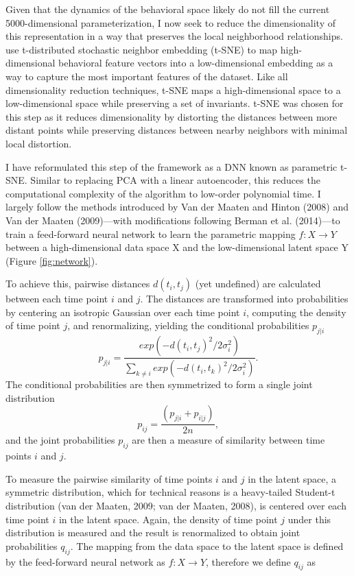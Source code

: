 \documentclass[11pt,a4paper,oneside]{article}
\begin{document}
\begin{appendices}
Given that the dynamics of the behavioral space likely do not fill the current 5000-dimensional parameterization, I now seek to reduce the dimensionality of this representation in a way that preserves the local neighborhood relationships. \citet{berman2014mapping,berman2014drosopholid} use t-distributed stochastic neighbor embedding (t-SNE) to map high-dimensional behavioral feature vectors into a low-dimensional embedding as a way to capture the most important features of the dataset. Like all dimensionality reduction techniques, t-SNE maps a high-dimensional space to a low-dimensional space while preserving a set of invariants. t-SNE was chosen for this step as it reduces dimensionality by distorting the distances between more distant points while preserving distances between nearby neighbors with minimal local distortion.
\par
I have reformulated this step of the framework as a DNN known as parametric t-SNE. Similar to replacing PCA with a linear autoencoder, this reduces the computational complexity of the algorithm to low-order polynomial time. I largely follow the methods introduced by Van der Maaten and Hinton (2008) and Van der Maaten (2009)---with modifications following Berman et al. (2014)---to train a feed-forward neural network to learn the parametric mapping $f: X \to Y$ between a high-dimensional data space X and the low-dimensional latent space Y (Figure \ref{fig:network}). 
\par
To achieve this, pairwise distances $d(t_i,t_j)$ (yet undefined) are calculated between each time point $i$ and $j$. The distances are transformed into probabilities by centering an isotropic Gaussian over each time point $i$, computing the density of time point $j$, and renormalizing, yielding the conditional probabilities $p_{j|i}$
\begin{equation}
p_{j|i}= \frac{exp(-d(t_i,t_j)^2/2\sigma^2_i)}
{\sum_{k\neq i} exp(-d(t_i,t_k)^2/2\sigma^2_i)}.
\end{equation}
The conditional probabilities are then symmetrized to form a single joint distribution
\begin{equation}
p_{ij} = \frac{(p_{j|i} + p_{i|j})}{2n},
\end{equation}
and the joint probabilities $p_{ij}$ are then a measure of similarity between time points $i$ and $j$.
\par
To measure the pairwise similarity of time points $i$ and $j$ in the latent space, a symmetric distribution, which for technical reasons is a heavy-tailed Student-t distribution (van der Maaten, 2009; van der Maaten, 2008), is centered over each time point $i$ in the latent space. Again, the density of time point $j$ under this distribution is measured and the result is renormalized to obtain joint probabilities $q_{ij}$. The mapping from the data space to the latent space is defined by the feed-forward neural network as $f: X \to Y$, therefore we define $q_{ij}$ as

\end{appendices}
\end{document}
